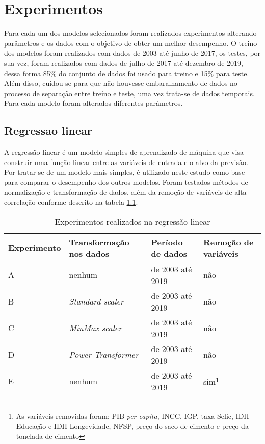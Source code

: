 
\chapter{Experimentos}

Para cada um dos modelos selecionados foram realizados experimentos
alterando parâmetros e os dados com o objetivo de obter um melhor 
desempenho. O treino dos modelos foram realizados com dados 
de 2003 até junho de 2017,  os testes, por sua vez, foram realizados com dados de 
julho de 2017 até dezembro de 2019, dessa forma 85\% do conjunto 
de dados foi usado para treino e 15\% para teste. Além disso, 
cuidou-se para que não houvesse embaralhamento de dados no 
processo de separação entre treino e teste, uma vez trata-se 
de dados temporais. Para cada modelo foram 
alterados diferentes parâmetros.

\section{Regressao linear}

A regressão linear é um modelo simples de aprendizado de máquina que visa 
construir uma função linear entre as variáveis de entrada e o alvo da previsão. 
Por tratar-se de um modelo mais simples, é utilizado 
neste estudo como base para comparar o desempenho dos
outros modelos. Foram testados métodos de normalização  e transformação de 
dados, além da 
remoção de variáveis de alta correlação conforme 
descrito na tabela \ref{tab:exp-reg-lin}. 

\begin{table}
    \centering
    \begin{tabular}{llll}
        \toprule
        Experimento & Transformação nos dados     & Período de dados & Remoção de variáveis  \\
        \midrule
        A           & nenhum & de 2003 até 2019            & não~                                     \\
        B           & \textit{Standard scaler}~            & de 2003 até 2019            & não~ ~                                   \\
        C           & \textit{MinMax scaler}~ ~            & de 2003 até 2019            & não~ ~ ~                                 \\
        D           & \textit{Power Transformer}           & de 2003 até 2019            & não                                      \\
        E           & nenhum & de 2003 até 2019            & sim\footnote{As variáveis removidas foram: PIB \textit{per capita}, INCC, IGP, taxa Selic, IDH Educação e IDH Longevidade, 
        NFSP, preço do saco de cimento e preço da tonelada de cimento}                                      \\
        \bottomrule
    \end{tabular}
    \label{tab:exp-reg-lin}
    \caption{Experimentos realizados na regressão linear}
\end{table}

